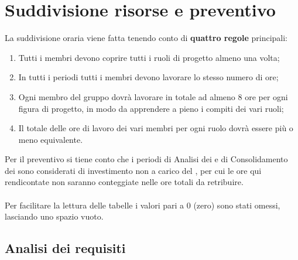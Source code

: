 \documentclass[PianoDiProgetto.tex]{subfiles}
\begin{document}
	

\chapter{Suddivisione risorse e preventivo}
La suddivisione oraria viene fatta tenendo conto di \textbf{quattro regole} principali:
\begin{enumerate}
	\item Tutti i membri devono coprire tutti i ruoli di progetto almeno una volta;
	\item In tutti i periodi tutti i membri devono lavorare lo stesso numero di ore;
	\item Ogni membro del gruppo dovrà lavorare in totale ad almeno 8 ore per ogni figura di progetto, in modo da apprendere a pieno i compiti dei vari ruoli;
	\item Il totale delle ore di lavoro dei vari membri per ogni ruolo dovrà essere più o meno equivalente.
\end{enumerate}
Per il preventivo si tiene conto che i periodi di Analisi dei  e di Consolidamento dei  sono considerati di investimento non a carico del , per cui le ore qui rendicontate non saranno conteggiate nelle ore totali da retribuire.\\\\
Per facilitare la lettura delle tabelle i valori pari a 0 (zero) sono stati omessi, lasciando uno spazio vuoto.
\newpage
\section{Analisi dei requisiti}
\end{document}
